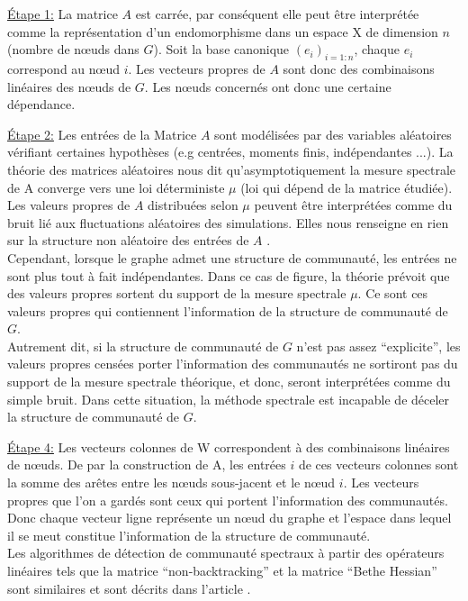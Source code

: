 \par{\underline{Étape 1:}}
La matrice $A$ est carrée, par conséquent elle peut être interprétée comme la représentation d'un endomorphisme dans un espace X de dimension $n$ (nombre de nœuds dans $G$).
Soit la base canonique $(e_i)_{i=1:n}$, chaque $e_i$ correspond au nœud $i$.
Les vecteurs propres de $A$ sont donc des combinaisons linéaires des nœuds de $G$.
Les nœuds concernés ont donc une certaine dépendance.
\par{\underline{Étape 2:}}
Les entrées de la Matrice $A$ sont modélisées par des variables aléatoires vérifiant certaines hypothèses (e.g centrées, moments finis, indépendantes ...).
La théorie des matrices aléatoires nous dit qu’asymptotiquement la mesure spectrale de A converge vers une loi déterministe $\mu$ (loi qui dépend de la matrice étudiée).
Les valeurs propres de $A$ distribuées selon $\mu$ peuvent être interprétées comme du bruit lié aux fluctuations aléatoires des simulations.
Elles nous renseigne en rien sur la structure non aléatoire des entrées de $A$ .\\
Cependant, lorsque le graphe admet une structure de communauté, les entrées ne sont plus tout à fait indépendantes.
Dans ce cas de figure, la théorie prévoit que des valeurs propres sortent du support de la mesure spectrale $\mu$.
Ce sont ces valeurs propres qui contiennent l'information de la structure de communauté de $G$.\\
Autrement dit, si la structure de communauté de $G$ n'est pas assez ``explicite'', les valeurs propres censées porter l'information des communautés ne sortiront pas du support de la mesure spectrale théorique, et donc, seront interprétées comme du simple bruit.
Dans cette situation, la méthode spectrale est incapable de déceler la structure de communauté de $G$.
\par{\underline{Étape 4:}}
Les vecteurs colonnes de W correspondent à des combinaisons linéaires de nœuds.
De par la construction de A, les entrées $i$ de ces vecteurs colonnes sont la somme des arêtes entre les nœuds sous-jacent et le nœud $i$.
Les vecteurs propres que l'on a gardés sont ceux qui portent l'information des communautés.
Donc chaque vecteur ligne représente un nœud du graphe et l'espace dans lequel il se meut constitue l'information de la structure de communauté.\\

Les algorithmes de détection de communauté spectraux à partir des opérateurs linéaires tels que la matrice ``non-backtracking'' et la matrice ``Bethe Hessian'' sont similaires et sont décrits dans l'article \cite[Spectral detection in the censored block model]{Spectral_Detection_in_the_Censored_Block_Model}.

